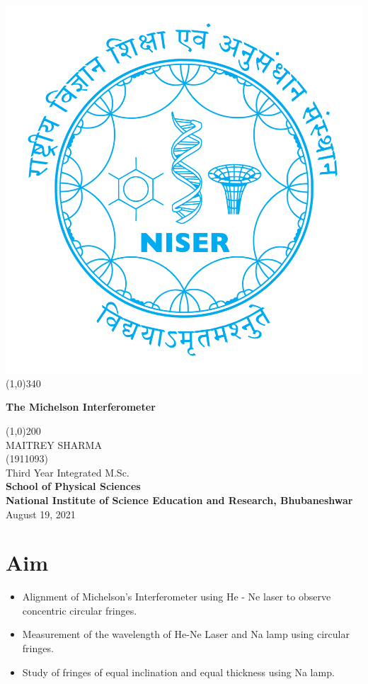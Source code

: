 \documentclass{article}
\begin{document}
\begin{titlepage}
\begin{center}
\includegraphics[scale=0.12]{document/niser.png}
\line(1,0){340}\\
[2mm]
\begin{large}
\textbf{\huge The Michelson Interferometer}\\ 
\end{large}
\line(1,0){200}\\
[5cm]
\large MAITREY SHARMA\\
\small (1911093)\\
[3.5cm]
Third Year Integrated M.Sc.\\
\textbf{School of Physical Sciences}\\
\textbf{National Institute of Science Education and Research, Bhubaneshwar}\\
\small August 19, 2021
\end{center} 
\end{titlepage}
\newpage
\section{Aim}
\begin{itemize}
    \item Alignment of Michelson’s Interferometer using He - Ne laser to observe concentric circular fringes.
    \item Measurement of the wavelength of He-Ne Laser and Na lamp using circular fringes.
    \item Study of fringes of equal inclination and equal thickness using Na lamp.
\end{itemize}
\end{document}
